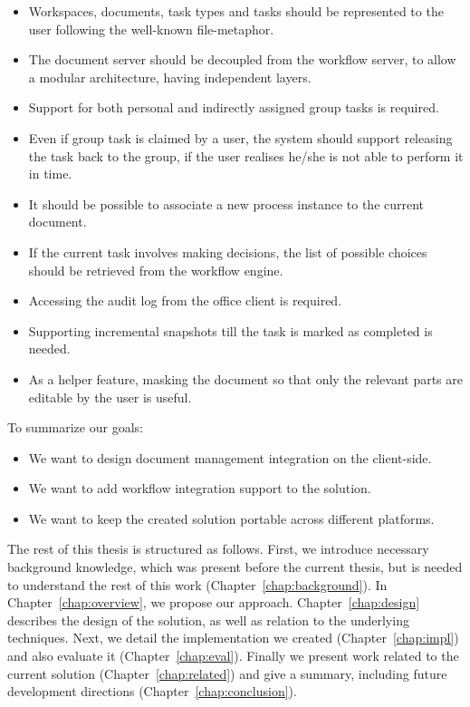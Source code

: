 \begin{itemize}
\item Workspaces, documents, task types and tasks should be represented to the
user following the well-known file-metaphor.
\item The document server should be decoupled from the workflow server, to
allow a modular architecture, having independent layers.
\item Support for both personal and indirectly assigned group tasks is required.
\item Even if group task is claimed by a user, the system should support
releasing the task back to the group, if the user realises he/she is not able to
perform it in time.
\item It should be possible to associate a new process instance to the current
document.
\item If the current task involves making decisions, the list of possible
choices should be retrieved from the workflow engine.
\item Accessing the audit log from the office client is required.
\item Supporting incremental snapshots till the task is marked as completed is
needed.
\item As a helper feature, masking the document so that only the relevant parts
are editable by the user is useful.
\end{itemize}

To summarize our goals:

\begin{itemize}
\item We want to design document management integration on the client-side.
\item We want to add workflow integration support to the solution.
\item We want to keep the created solution portable across different platforms.
\end{itemize}

The rest of this thesis is structured as follows. First, we introduce necessary
background knowledge, which was present before the current thesis, but is
needed to understand the rest of this work (Chapter~\ref{chap:background}). In
Chapter~\ref{chap:overview}, we propose our approach. Chapter~\ref{chap:design}
describes the design of the solution, as well as relation to the underlying
techniques. Next, we detail the implementation we created
(Chapter~\ref{chap:impl}) and also evaluate it (Chapter~\ref{chap:eval}).
Finally we present work related to the current solution
(Chapter~\ref{chap:related}) and give a summary, including future development
directions (Chapter~\ref{chap:conclusion}).
